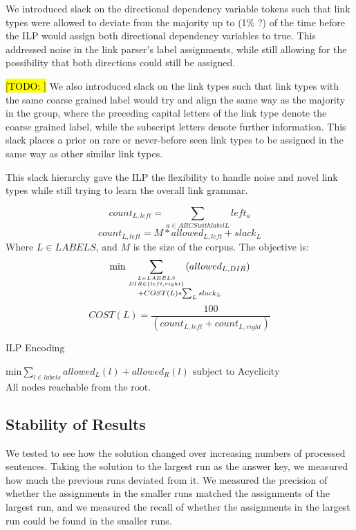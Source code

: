 \documentclass[11pt]{article}
\newcommand{\Note}[1]{}
\renewcommand{\Note}[1]{\hl{[#1]}}  %
\newcommand{\TODO}[1]{\Note{TODO: #1}}
\begin{document}
We introduced slack on the directional dependency variable tokens such that link types were allowed to deviate from the majority up to (1\% ?) of the time before the ILP would assign both directional dependency variables to true. This addressed noise in the link parser's label assignments, while still allowing for the possibility that both directions could still be assigned.

\TODO{} We also introduced slack on the link types such that link types with the same coarse grained label would try and align the same way as the majority in the group, where the preceding capital letters of the link type denote the coarse grained label, while the subscript letters denote further information. This slack places a prior on rare or never-before seen link types to be assigned in the same way as other similar link types.

This slack hierarchy gave the ILP the flexibility to handle noise and novel link types while still trying to learn the overall link grammar.


\begin{equation}
  count_{L, left} = \sum_{a \in ARCS with label L} left_a
\end{equation}
\begin{equation}
  count_{L, left} = M * allowed_{L,left} + slack_{L}
\end{equation}
Where $L \in LABELS$, and $M$ is the size of the corpus.
The objective is:
\begin{equation}
  \min \sum_{L \in LABELS \atop DIR \in \{left, right\}} (allowed_{L,DIR}) \atop + COST(L) * \sum_L slack_L
\end{equation}
\begin{equation}
  COST(L) = \frac{100}{(count_{L,left} + count_{L,right})}
\end{equation}


\begin{algorithm}
\caption{ILP Encoding}\label{ILP}
\begin{algorithmic}[1]

\State $\text{min} \sum_{l \in labels} allowed_L(l) + allowed_R(l)$
\State $\text{subject to}$
\State $\text{Acyclicity}$
\State $\text{All nodes reachable from the root.}$

\end{algorithmic}
\end{algorithm}



\subsection{Stability of Results}
We tested to see how the solution changed over increasing numbers of processed sentences. 
Taking the solution to the largest run as the answer key, we measured how much the previous runs deviated from it. We measured the precision of whether the assignments in the smaller runs matched the assignments of the largest run, and we measured the recall of whether the assignments in the largest run could be found in the smaller runs. 
\end{document}
